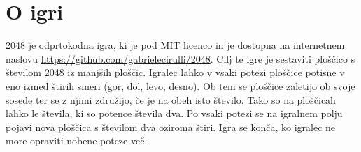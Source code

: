 \documentclass[a4paper,11pt]{article}
\begin{document}
\section{O igri}
2048 je odprtokodna igra, ki je pod \href{https://en.wikipedia.org/wiki/MIT_License}{MIT licenco} in je dostopna na internetnem naslovu \href{https://github.com/gabrielecirulli/2048}{https://github.com/gabrielecirulli/2048}. Cilj te igre je sestaviti ploščico s številom 2048 iz manjših ploščic. Igralec lahko v vsaki potezi ploščice potisne v eno izmed štirih smeri (gor, dol, levo, desno). Ob tem se ploščice zaletijo ob svoje sosede ter se z njimi združijo, če je na obeh isto število. Tako so na ploščicah lahko le števila, ki so potence števila dva. Po vsaki potezi se na igralnem polju pojavi nova ploščica s številom dva oziroma štiri. Igra se konča, ko igralec ne more opraviti nobene poteze več.
\end{document}
